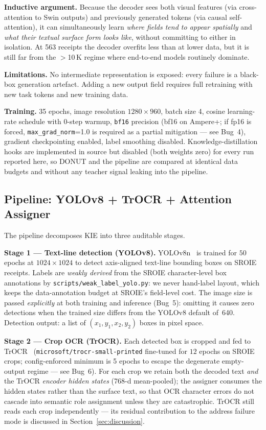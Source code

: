 \documentclass[conference]{IEEEtran}
\begin{document}
\textbf{Inductive argument.}
Because the decoder sees both visual features (via cross-attention to
Swin outputs) and previously generated tokens (via causal
self-attention), it can simultaneously learn \emph{where fields
tend to appear spatially} and \emph{what their textual surface form
looks like}, without committing to either in isolation.  At
563 receipts the decoder overfits less than at lower
data, but it is still far from the $>$10\,K regime where end-to-end
models routinely dominate.

\textbf{Limitations.}
No intermediate representation is exposed: every failure is a
black-box generation artefact.  Adding a new output field requires
full retraining with new task tokens and new training data.

\textbf{Training.}
35 epochs, image resolution
$1280\times960$, batch size 4,
cosine learning-rate schedule with 0-step warmup,
\texttt{bf16} precision (bf16 on Ampere+; if fp16 is
forced, \texttt{max\_grad\_norm}=1.0 is required as a partial
mitigation --- see Bug~4), gradient
checkpointing enabled, label smoothing disabled.
Knowledge-distillation hooks are implemented in source but disabled
(both weights zero) for every run reported here, so DONUT and the
pipeline are compared at identical data budgets and without any
teacher signal leaking into the pipeline.

\subsection{Pipeline: YOLOv8 + TrOCR + Attention Assigner}
\label{sec:pipeline_desc}

The pipeline decomposes KIE into three auditable stages.

\textbf{Stage 1 --- Text-line detection (YOLOv8).}
YOLOv8n~\cite{jocher2023yolov8} is trained for $50$ epochs
at $1024\times1024$ to detect axis-aligned
text-line bounding boxes on SROIE receipts.
Labels are \emph{weakly derived} from the SROIE character-level box
annotations by \texttt{scripts/weak\_label\_yolo.py}: we never hand-label
layout, which keeps the data-annotation budget at SROIE's field-level cost.
The image size is passed \emph{explicitly} at both training and
inference (Bug~5): omitting it causes zero detections when the
trained size differs from the YOLOv8 default of~640.
Detection output: a list of $(x_1,y_1,x_2,y_2)$ boxes in pixel space.

\textbf{Stage 2 --- Crop OCR (TrOCR).}
Each detected box is cropped and fed to
TrOCR~\cite{li2023trocr} (\texttt{microsoft/trocr-small-printed}
fine-tuned for $12$ epochs on SROIE crops;
config-enforced minimum is 5 epochs to escape the degenerate
empty-output regime --- see Bug~6).  For each crop we retain both
the decoded text \emph{and} the
TrOCR \emph{encoder hidden states} (768-d mean-pooled); the assigner
consumes the hidden states rather than the surface text, so that OCR
character errors do not cascade into semantic role assignment unless
they are catastrophic.  TrOCR still reads each crop independently ---
its residual contribution to the address failure mode is discussed in
Section~\ref{sec:discussion}.
\end{document}

